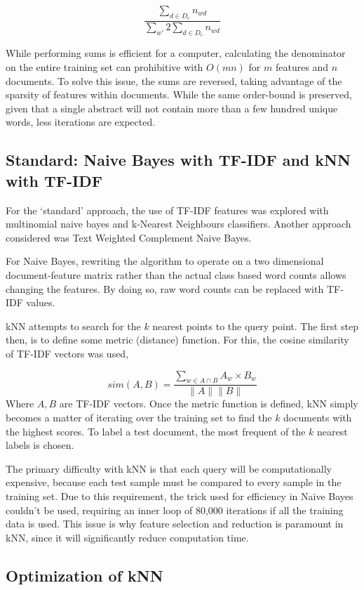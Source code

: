 \documentclass[10pt,twocolumn]{article}
\begin{document}
\[\frac {\sum_{d \in D_c} n_{wd}} {\sum_{w'} 2\sum_{d\in D_c} n_{wd}} \]

While performing sums is efficient for a computer, calculating the denominator on the entire training set can prohibitive with $O(mn)$ for $m$ features and $n$ documents. To solve this issue, the sums are reversed, taking advantage of the sparsity of features within documents. While the same order-bound is preserved, given that a single abstract will not contain more than a few hundred unique words, less iterations are expected.

\subsection*{Standard: Naive Bayes with TF-IDF and kNN with TF-IDF}

For the `standard' approach, the use of TF-IDF features was explored with multinomial naive bayes and k-Nearest Neighbours classifiers. Another approach considered was Text Weighted Complement Naive Bayes.

For Naive Bayes, rewriting the algorithm to operate on a two dimensional document-feature matrix rather than the actual class based word counts allows changing the features. By doing so, raw word counts can be replaced with TF-IDF values. 

kNN attempts to search for the $k$ nearest points to the query point. The first step then, is to define some metric (distance) function. For this, the cosine similarity of TF-IDF vectors was used,

\[
sim(A,B) = \frac {\sum_{w \in A \cap B} A_w \times B_w} {\| A \| \| B \|}
\]
Where $A,B$ are TF-IDF vectors. Once the metric function is defined, kNN simply becomes a matter of iterating over the training set to find the $k$ documents with the highest scores. To label a test document, the most frequent of the $k$ nearest labels is chosen.

The primary difficulty with kNN is that each query will be computationally expensive, because each test sample must be compared to every sample in the training set. Due to this requirement, the trick used for efficiency in Naive Bayes couldn't be used, requiring an inner loop of 80,000 iterations if all the training data is used. This issue is why feature selection and reduction is paramount in kNN, since it will significantly reduce computation time.

\subsection*{Optimization of kNN}
\end{document}
